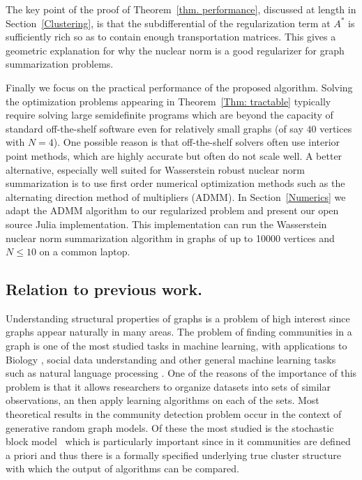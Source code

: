 \documentclass[12pt]{amsart}
\theoremstyle{remark}
\begin{document}
The key point of the proof of Theorem~\ref{thm. performance}, discussed at length in Section~\ref{Clustering}, is that the subdifferential of the regularization term at $A^*$ is sufficiently rich so as to contain enough transportation matrices. This gives a geometric explanation for why the nuclear norm is a good regularizer for graph summarization problems.
 
Finally we focus on the practical performance of the proposed algorithm. Solving the optimization problems appearing in Theorem~\ref{Thm: tractable} typically require solving large semidefinite programs which are beyond the  capacity of standard off-the-shelf software even for relatively small graphs (of say $40$ vertices with $N=4$). One possible reason is that off-the-shelf solvers often use interior point methods, which are highly accurate but often do not scale well. A better alternative, especially well suited for Wasserstein robust nuclear norm summarization is to use first order numerical optimization methods such as the alternating direction method of multipliers (ADMM). In Section~\ref{Numerics} we adapt the ADMM algorithm to our regularized problem and present our open source Julia implementation. This implementation can run the Wasserstein nuclear norm summarization algorithm in graphs of up to 10000 vertices and $N\leq 10$ on a common laptop. 

\subsection{Relation to previous work.}
\label{Sec: PreviousWork}

Understanding structural properties of graphs is a problem of high interest since graphs appear naturally in many areas. The problem of finding communities in a graph is one of the most studied tasks in machine learning, with  applications to Biology \cite{cabreros2016detecting, cline2007integration,xu2002clustering}, social data understanding \cite{domingos2001mining,mishra2007clustering,newman2002random} and other general machine learning tasks such as natural language processing \cite{collobert2011natural,ratinov2009design}. One of the reasons of the importance of this problem is that it allows researchers to organize datasets into sets of similar observations, an then apply learning algorithms on each of the sets.  
Most theoretical results in the community detection problem occur in the context of generative random graph models. Of these the most studied is the stochastic block model~\cite{abbe2017community} which is particularly important since in it communities are defined a priori and thus there is a formally specified underlying true cluster structure with which the output of algorithms can be compared.
\end{document}
